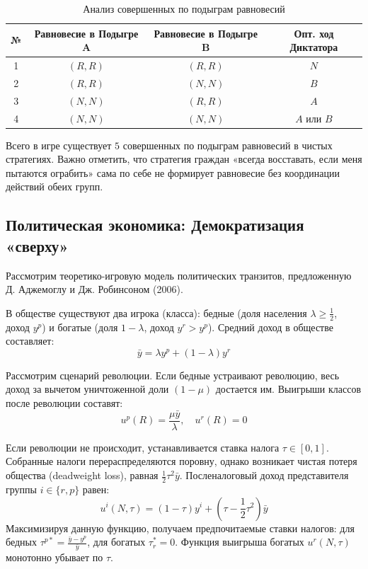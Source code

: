 \begin{example}
\begin{table}[h]
\centering
\renewcommand{\arraystretch}{1.3}
\begin{NiceTabular}{cccc}
\toprule
\textbf{№} & \textbf{Равновесие в Подыгре A} & \textbf{Равновесие в Подыгре B} & \textbf{Опт. ход Диктатора} \\
 & $(R, R)$ & $(R, R)$ & $N$ \\
2 & $(R, R)$ & $(N, N)$ & $B$ \\
3 & $(N, N)$ & $(R, R)$ & $A$ \\
4 & $(N, N)$ & $(N, N)$ & $A$ или $B$ \\
\bottomrule
\end{NiceTabular}
\caption{Анализ совершенных по подыграм равновесий}
\end{table}

Всего в игре существует $5$ совершенных по подыграм равновесий в чистых стратегиях. Важно отметить, что стратегия граждан «всегда восставать, если меня пытаются ограбить» сама по себе не формирует равновесие без координации действий обеих групп.
\end{example}

\subsection{Политическая экономика: Демократизация «сверху»}

Рассмотрим теоретико-игровую модель политических транзитов, предложенную Д. Аджемоглу и Дж. Робинсоном (2006).

\begin{definition}
В обществе существуют два игрока (класса): бедные (доля населения $\lambda \ge \frac{1}{2}$, доход $y^p$) и богатые (доля $1 - \lambda$, доход $y^r > y^p$). Средний доход в обществе составляет:
\begin{equation}
    \bar{y} = \lambda y^p + (1 - \lambda)y^r
\end{equation}
\end{definition}

Рассмотрим сценарий революции. Если бедные устраивают революцию, весь доход за вычетом уничтоженной доли $(1 - \mu)$ достается им. Выигрыши классов после революции составят:
\begin{equation}
    u^p(R) = \frac{\mu\bar{y}}{\lambda}, \quad u^r(R) = 0
\end{equation}

Если революции не происходит, устанавливается ставка налога $\tau \in [0, 1]$. Собранные налоги перераспределяются поровну, однако возникает чистая потеря общества (deadweight loss), равная $\frac{1}{2}\tau^2\bar{y}$. Посленалоговый доход представителя группы $i \in \{r, p\}$ равен:
\begin{equation}
    u^i(N, \tau) = (1 - \tau)y^i + \left(\tau - \frac{1}{2}\tau^2\right)\bar{y}
\end{equation}
Максимизируя данную функцию, получаем предпочитаемые ставки налогов: для бедных $\tau^{p*} = \frac{\bar{y} - y^p}{\bar{y}}$, для богатых $\tau_r^* = 0$. Функция выигрыша богатых $u^r(N, \tau)$ монотонно убывает по $\tau$.

